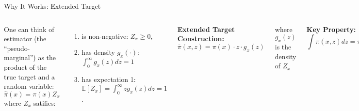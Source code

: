\documentclass[aspectratio=169]{beamer}
\begin{document}
\begin{frame}{Why It Works: Extended Target}

	\begin{columns}
		One can think of estimator (the “pseudo-marginal”) as the product of the true target and a random variable:
		\begin{equation*}
			\hat{\pi}(x) = \pi(x) Z_x
		\end{equation*}
		where $Z_x$ satifies:
		\begin{enumerate}
			\item is non-negative: $Z_x \geq 0$,
			\item has density $g_x(·)$: $\int_0^{\infty} g_x(z)dz = 1$
			\item has expectation 1: $\mathbb{E}[Z_x] = \int_0^{\infty} z g_x(z) dz = 1$.
		\end{enumerate}

		\textbf{Extended Target Construction:}
		\begin{equation*}
			\bar{\pi}(x,z) = \pi(x) \cdot z \cdot g_x(z)
		\end{equation*}

		where $g_x(z)$ is the density of $Z_x$

		\vspace{0.5cm}
		\textbf{Key Property:}
		\begin{equation*}
			\int \bar{\pi}(x,z) dz = \pi(x)
		\end{equation*}

		\vspace{0.3cm}
		\textbf{Intuition:}
		\begin{itemize}
			\item Run exact MCMC on $(x,z)$ space
			\item Marginal in $x$ gives correct target
			\item $z$ represents the "noise" in estimates
		\end{itemize}
	\end{columns}
\end{frame}
\end{document}
